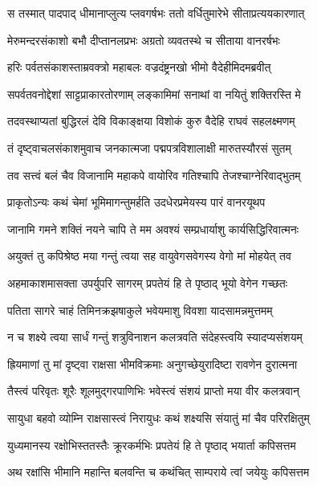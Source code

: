 \twolineshloka
{स तस्मात् पादपाद् धीमानाप्लुत्य प्लवगर्षभः}
{ततो वर्धितुमारेभे सीताप्रत्ययकारणात्} %

\twolineshloka
{मेरुमन्दरसंकाशो बभौ दीप्तानलप्रभः}
{अग्रतो व्यवतस्थे च सीताया वानरर्षभः} %

\twolineshloka
{हरिः पर्वतसंकाशस्ताम्रवक्त्रो महाबलः}
{वज्रदंष्ट्रनखो भीमो वैदेहीमिदमब्रवीत्} %

\twolineshloka
{सपर्वतवनोद्देशां साट्टप्राकारतोरणाम्}
{लङ्कामिमां सनाथां वा नयितुं शक्तिरस्ति मे} %

\twolineshloka
{तदवस्थाप्यतां बुद्धिरलं देवि विकाङ्क्षया}
{विशोकं कुरु वैदेहि राघवं सहलक्ष्मणम्} %

\twolineshloka
{तं दृष्ट्वाचलसंकाशमुवाच जनकात्मजा}
{पद्मपत्रविशालाक्षी मारुतस्यौरसं सुतम्} %

\twolineshloka
{तव सत्त्वं बलं चैव विजानामि महाकपे}
{वायोरिव गतिश्चापि तेजश्चाग्नेरिवाद्भुतम्} %

\twolineshloka
{प्राकृतोऽन्यः कथं चेमां भूमिमागन्तुमर्हति}
{उदधेरप्रमेयस्य पारं वानरयूथप} %

\twolineshloka
{जानामि गमने शक्तिं नयने चापि ते मम}
{अवश्यं सम्प्रधार्याशु कार्यसिद्धिरिवात्मनः} %

\twolineshloka
{अयुक्तं तु कपिश्रेष्ठ मया गन्तुं त्वया सह}
{वायुवेगसवेगस्य वेगो मां मोहयेत् तव} %

\twolineshloka
{अहमाकाशमासक्ता उपर्युपरि सागरम्}
{प्रपतेयं हि ते पृष्ठाद् भूयो वेगेन गच्छतः} %

\twolineshloka
{पतिता सागरे चाहं तिमिनक्रझषाकुले}
{भवेयमाशु विवशा यादसामन्नमुत्तमम्} %

\twolineshloka
{न च शक्ष्ये त्वया सार्धं गन्तुं शत्रुविनाशन}
{कलत्रवति संदेहस्त्वयि स्यादप्यसंशयम्} %

\twolineshloka
{ह्रियमाणां तु मां दृष्ट्वा राक्षसा भीमविक्रमाः}
{अनुगच्छेयुरादिष्टा रावणेन दुरात्मना} %

\twolineshloka
{तैस्त्वं परिवृतः शूरैः शूलमुद्गरपाणिभिः}
{भवेस्त्वं संशयं प्राप्तो मया वीर कलत्रवान्} %

\twolineshloka
{सायुधा बहवो व्योम्नि राक्षसास्त्वं निरायुधः}
{कथं शक्ष्यसि संयातुं मां चैव परिरक्षितुम्} %

\twolineshloka
{युध्यमानस्य रक्षोभिस्ततस्तैः क्रूरकर्मभिः}
{प्रपतेयं हि ते पृष्ठाद् भयार्ता कपिसत्तम} %

\twolineshloka
{अथ रक्षांसि भीमानि महान्ति बलवन्ति च}
{कथंचित् साम्पराये त्वां जयेयुः कपिसत्तम} %

